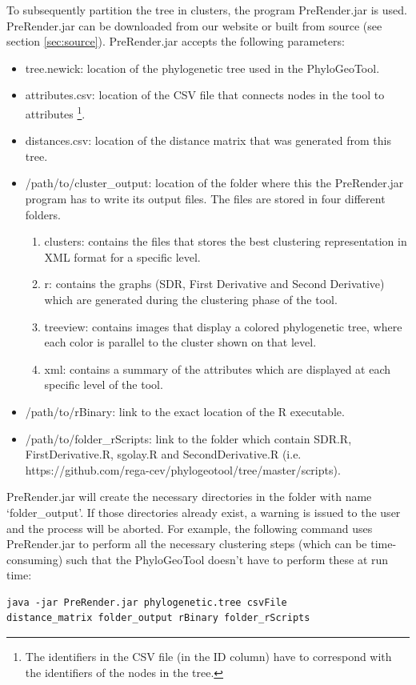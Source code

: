 \documentclass[a4paper, 11pt]{article} %
\begin{document}
To subsequently partition the tree in clusters, the program PreRender.jar is used. PreRender.jar can be downloaded from our website or built from source (see section \ref{sec:source}). 
PreRender.jar accepts the following parameters:
\begin{itemize}
\item tree.newick: location of the phylogenetic tree used in the PhyloGeoTool.
\item attributes.csv: location of the CSV file that connects nodes in the tool to attributes \footnote{The identifiers in the CSV file (in the ID column) have to correspond with the identifiers of the nodes in the tree.}.
\item distances.csv: location of the distance matrix that was generated from this tree.
\item /path/to/cluster\_output: location of the folder where this the PreRender.jar program has to write its output files. The files are stored in four different folders.
\begin{enumerate}
	\item clusters: contains the files that stores the best clustering representation in XML format for a specific level.
	\item r: contains the graphs (SDR, First Derivative and Second Derivative) which are generated during the clustering phase of the tool.
	\item treeview: contains images that display a colored phylogenetic tree, where each color is parallel to the cluster shown on that level.
	\item xml: contains a summary of the attributes which are displayed at each specific level of the tool.
\end{enumerate}
\item /path/to/rBinary: link to the exact location of the R executable.
\item /path/to/folder\_rScripts: link to the folder which contain SDR.R, FirstDerivative.R, sgolay.R and SecondDerivative.R (i.e. https://github.com/rega-cev/phylogeotool/tree/master/scripts).
\end{itemize}
PreRender.jar will create the necessary directories in the folder with name `folder\_output'.
If those directories already exist, a warning is issued to the user and the process will be aborted.
For example, the following command uses PreRender.jar to perform all the necessary clustering steps (which can be time-consuming) such that the PhyloGeoTool doesn't have to perform these at run time: 
\begin{verbatim}
java -jar PreRender.jar phylogenetic.tree csvFile
distance_matrix folder_output rBinary folder_rScripts
\end{verbatim}
\end{document}
